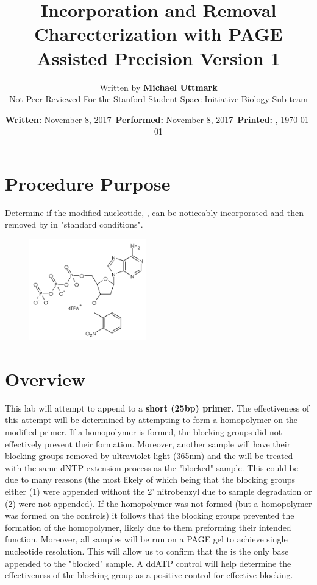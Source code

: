 \documentclass{ssiBio}
\title{\BdATP{} Incorporation and Removal Charecterization with PAGE Assisted Precision Version 1} %
\author{Written by \textbf{Michael Uttmark}\\ %
		Not Peer Reviewed %
        For the Stanford Student Space Initiative Biology Sub team}
\date{\textbf{Written:} November 8, 2017 \,\textbf{Performed:} November 8, 2017 \,\textbf{Printed:} \currenttime{}, \today{}}
\begin{document}
\maketitle
\section{Procedure Purpose} %
Determine if the modified nucleotide, \BdATP{}, can be noticeably incorporated and then removed by \tdt{} in "standard conditions".
\begin{figure}[ht]
\centering
\includegraphics[width=2in]{./resources/BdATP-Structure.png}
\caption{\BdATP{}}
\label{bdatp}
\end{figure}
\section{Overview} %
This lab will attempt to append \BdATP{} to a \textbf{short (25bp) primer}. The effectiveness of this attempt will be determined by attempting to form a homopolymer on the modified primer. If a homopolymer is formed, the blocking groups did not effectively prevent their formation. Moreover, another sample will have their blocking groups removed by ultraviolet light (365nm) and the will be treated with the same dNTP extension process as the "blocked" sample. This could be due to many reasons (the most likely of which being that the blocking groups either (1) were appended without the 2' nitrobenzyl due to sample degradation or (2) were not appended). If the homopolymer was not formed (but a homopolymer was formed on the controls) it follows that the blocking groups prevented the formation of the homopolymer, likely due to them preforming their intended function. Moreover, all samples will be run on a PAGE gel to achieve single nucleotide resolution. This will allow us to confirm that the \BdATP{} is the only base appended to the "blocked" sample. A ddATP control will help determine the effectiveness of the blocking group as a positive control for effective blocking.

\end{document}
